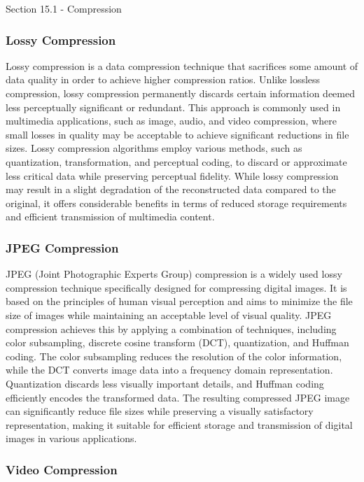 \begin{notes}{Section 15.1 - Compression}
    \subsubsection{Lossy Compression}
    
    Lossy compression is a data compression technique that sacrifices some amount of data quality in order to achieve higher compression ratios. Unlike lossless compression, lossy compression permanently 
    discards certain information deemed less perceptually significant or redundant. This approach is commonly used in multimedia applications, such as image, audio, and video compression, where small 
    losses in quality may be acceptable to achieve significant reductions in file sizes. Lossy compression algorithms employ various methods, such as quantization, transformation, and perceptual coding, 
    to discard or approximate less critical data while preserving perceptual fidelity. While lossy compression may result in a slight degradation of the reconstructed data compared to the original, it 
    offers considerable benefits in terms of reduced storage requirements and efficient transmission of multimedia content.
    
    \subsubsection{JPEG Compression}
    
    JPEG (Joint Photographic Experts Group) compression is a widely used lossy compression technique specifically designed for compressing digital images. It is based on the principles of human visual 
    perception and aims to minimize the file size of images while maintaining an acceptable level of visual quality. JPEG compression achieves this by applying a combination of techniques, including color 
    subsampling, discrete cosine transform (DCT), quantization, and Huffman coding. The color subsampling reduces the resolution of the color information, while the DCT converts image data into a frequency 
    domain representation. Quantization discards less visually important details, and Huffman coding efficiently encodes the transformed data. The resulting compressed JPEG image can significantly reduce 
    file sizes while preserving a visually satisfactory representation, making it suitable for efficient storage and transmission of digital images in various applications.
    
    \subsubsection{Video Compression}
    

\end{notes}
